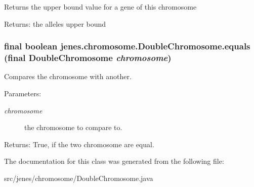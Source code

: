 Returns the upper bound value for a gene of this chromosome

\begin{Desc}
\item[Returns:]the alleles upper bound \end{Desc}
\hypertarget{classjenes_1_1chromosome_1_1_double_chromosome_d661abf584ceb5195b6b248798709fc9}{
\subsubsection[equals]{\setlength{\rightskip}{0pt plus 5cm}final boolean jenes.chromosome.DoubleChromosome.equals (final {\bf DoubleChromosome} {\em chromosome})}}
\label{classjenes_1_1chromosome_1_1_double_chromosome_d661abf584ceb5195b6b248798709fc9}


Compares the chromosome with another.

\begin{Desc}
\item[Parameters:]
\begin{description}
\item[{\em chromosome}]the chromosome to compare to. \end{description}
\end{Desc}
\begin{Desc}
\item[Returns:]True, if the two chromosome are equal. \end{Desc}


The documentation for this class was generated from the following file:\begin{CompactItemize}
\item 
src/jenes/chromosome/DoubleChromosome.java\end{CompactItemize}
